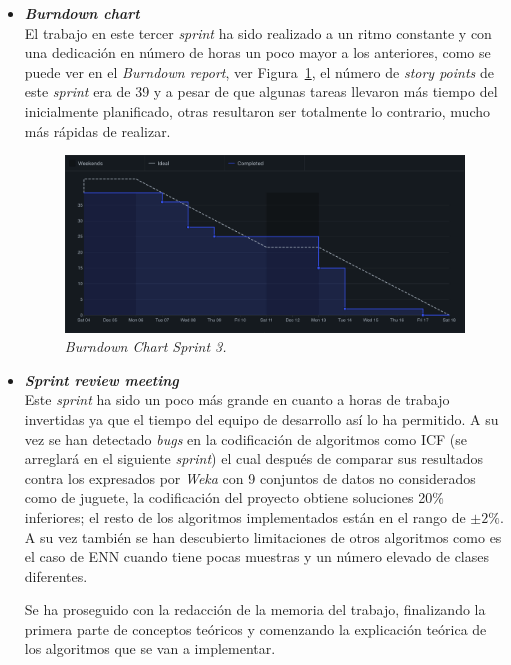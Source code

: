 \begin{itemize}
\item \textbf{\textit{Burndown chart}}\\
El trabajo en este tercer \textit{sprint} ha sido realizado a un ritmo constante y con una dedicación en número de horas un poco mayor a los anteriores, como se puede ver en el \textit{Burndown report}, ver Figura~\ref{fig:BD-Sprint3}, el número de \textit{story points} de este \textit{sprint} era de 39 y a pesar de que algunas tareas llevaron más tiempo del inicialmente planificado, otras resultaron ser totalmente lo contrario, mucho más rápidas de realizar.
\begin{figure}
\begin{center}
\includegraphics[width=\textwidth]{../img/anexos/sprints/BD-Sprint3}
\caption{\textit{Burndown Chart Sprint 3.}}\label{fig:BD-Sprint3}
\end{center}
\end{figure}
\item \textbf{\textit{Sprint review meeting}}\\
Este \textit{sprint} ha sido un poco más grande en cuanto a horas de trabajo invertidas ya que el tiempo del equipo de desarrollo así lo ha permitido. A su vez se han detectado \textit{bugs} en la codificación de algoritmos como ICF (se arreglará en el siguiente \textit{sprint}) el cual después de comparar sus resultados contra los expresados por \textit{Weka} con 9 conjuntos de datos no considerados como de juguete, la codificación del proyecto obtiene soluciones 20\% inferiores; el resto de los algoritmos implementados están en el rango de $\pm2\%$. A su vez también se han descubierto limitaciones de otros algoritmos como es el caso de ENN cuando tiene pocas muestras y un número elevado de clases diferentes.

Se ha proseguido con la redacción de la memoria del trabajo, finalizando la primera parte de conceptos teóricos y comenzando la explicación teórica de los algoritmos que se van a implementar.
\end{itemize}


